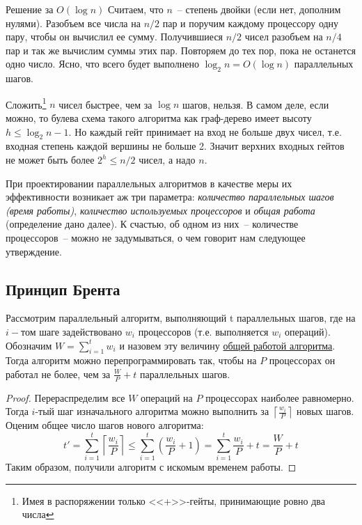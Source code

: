 \begin{algodescription}{Решение за $O(\log n)$} Считаем, что $n$~-- степень двойки (если нет, дополним нулями).  Разобъем все числа на $n/2$ пар и поручим каждому процессору одну пару, чтобы он вычислил ее сумму. Получившиеся $n/2$ чисел разобъем на $n/4$ пар и так же вычислим суммы этих пар. Повторяем до тех пор, пока не останется одно число. Ясно, что всего будет выполнено $\log_2 n = O(\log n)$ параллельных шагов. 
\end{algodescription}

\begin{nb*} Сложить\footnote{Имея в распоряжении только <<+>>-гейты, принимающие ровно два числа} $n$ чисел быстрее, чем за $\log n$ шагов, нельзя. В самом деле, если можно, то булева схема такого алгоритма как граф-дерево имеет высоту $h \leq \log_2 n - 1$. Но каждый гейт принимает на вход не больше двух чисел, т.е. входная степень каждой вершины не больше 2. Значит верхних входных гейтов не может быть более $2^h \leq n/2$  чисел, а надо $n$.
\end{nb*}

При проектировании параллельных алгоритмов в качестве меры их эффективности возникает аж три параметра: \textit{количество параллельных шагов (время работы)}, \textit{количество используемых процессоров} и \textit{общая работа} (определение дано далее). К счастью, об одном из них~-- количестве процессоров~-- можно не задумываться, о чем говорит нам следующее утверждение.

\subsection{Принцип Брента}
\begin{theorem*}
	Рассмотрим параллельный алгоритм, выполняющий t параллельных шагов, где на $i-$том шаге задействовано $w_i$ процессоров (т.е. выполняется $w_i$ операций). Обозначим $W=\sum\limits_{i=1}^t w_i$ и назовем эту величину \underline{общей работой алгоритма}. Тогда алгоритм можно перепрограммировать так, чтобы на $P$ процессорах он работал не более, чем за $\frac{W}{P} + t$ параллельных шагов.
\end{theorem*}

\begin{proof}
	Перераспределим все $W$ операций на $P$ процессорах наиболее равномерно. Тогда $i$-тый шаг изначального алгоритма можно выполнить за $\left\lceil\frac{w_i}{P}\right\rceil$ новых шагов. Оценим общее число шагов нового алгоритма:
$$t' = \sum_{i=1}^t \left\lceil\frac{w_i}{P}\right\rceil \leq \sum_{i=1}^t \left(\frac{w_i}{P} + 1\right) = \sum_{i=1}^t \frac{w_i}{P} + t = \frac{W}{P} + t$$Таким образом, получили алгоритм с искомым временем работы.
\end{proof}

